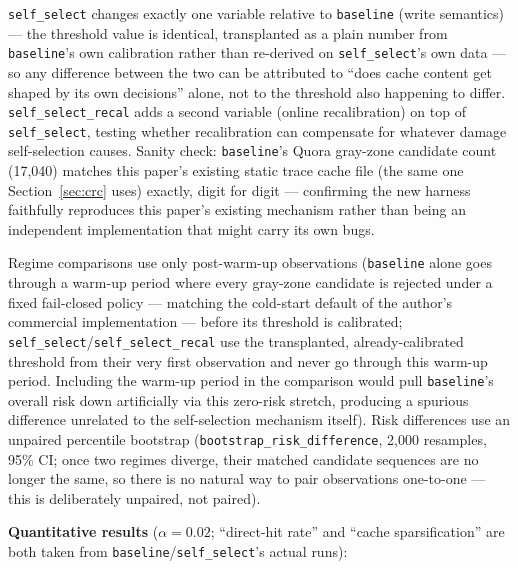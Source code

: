 \documentclass[11pt]{article}
\begin{document}
\texttt{self\_\allowbreak{}select} changes exactly one variable relative to \texttt{baseline} (write semantics) --- the threshold value is identical, transplanted as a plain number from \texttt{baseline}'s own calibration rather than re-derived on \texttt{self\_\allowbreak{}select}'s own data --- so any difference between the two can be attributed to ``does cache content get shaped by its own decisions'' alone, not to the threshold also happening to differ. \texttt{self\_\allowbreak{}select\_\allowbreak{}recal} adds a second variable (online recalibration) on top of \texttt{self\_\allowbreak{}select}, testing whether recalibration can compensate for whatever damage self-selection causes. Sanity check: \texttt{baseline}'s Quora gray-zone candidate count (17{,}040) matches this paper's existing static trace cache file (the same one Section~\ref{sec:crc} uses) exactly, digit for digit --- confirming the new harness faithfully reproduces this paper's existing mechanism rather than being an independent implementation that might carry its own bugs.

Regime comparisons use only post-warm-up observations (\texttt{baseline} alone goes through a warm-up period where every gray-zone candidate is rejected under a fixed fail-closed policy --- matching the cold-start default of the author's commercial implementation --- before its threshold is calibrated; \texttt{self\_\allowbreak{}select}/\texttt{self\_\allowbreak{}select\_\allowbreak{}recal} use the transplanted, already-calibrated threshold from their very first observation and never go through this warm-up period. Including the warm-up period in the comparison would pull \texttt{baseline}'s overall risk down artificially via this zero-risk stretch, producing a spurious difference unrelated to the self-selection mechanism itself). Risk differences use an unpaired percentile bootstrap (\texttt{bootstrap\_\allowbreak{}risk\_\allowbreak{}difference}, 2{,}000 resamples, 95\% CI; once two regimes diverge, their matched candidate sequences are no longer the same, so there is no natural way to pair observations one-to-one --- this is deliberately unpaired, not paired).

\textbf{Quantitative results} ($\alpha=0.02$; ``direct-hit rate'' and ``cache sparsification'' are both taken from \texttt{baseline}/\texttt{self\_\allowbreak{}select}'s actual runs):
\end{document}
